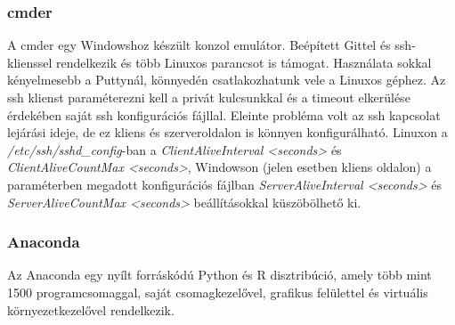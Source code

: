 \subsubsection{cmder}

A cmder egy Windowshoz készült konzol emulátor. Beépített Gittel és ssh-klienssel rendelkezik és több Linuxos parancsot is támogat. Használata sokkal kényelmesebb a Puttynál, könnyedén csatlakozhatunk vele a Linuxos géphez.
\newline
\newline
Az ssh klienst paraméterezni kell a privát kulcsunkkal és a timeout elkerülése érdekében saját ssh konfigurációs fájllal.
Eleinte probléma volt az ssh kapcsolat lejárási ideje, de ez kliens és szerveroldalon is könnyen konfigurálható. Linuxon a \emph{/etc/ssh/sshd\_config}-ban a \emph{ClientAliveInterval <seconds>} és \emph{ClientAliveCountMax <seconds>}, Windowson (jelen esetben kliens oldalon) a paraméterben megadott konfigurációs fájlban \emph{ServerAliveInterval <seconds>} és 
\emph{ServerAliveCountMax <seconds>} beállításokkal küszöbölhető ki.

\subsubsection{Anaconda}

Az Anaconda egy nyílt forráskódú Python és R disztribúció, amely több mint 1500 programcsomaggal, saját csomagkezelővel, grafikus felülettel és virtuális környezetkezelővel rendelkezik.

